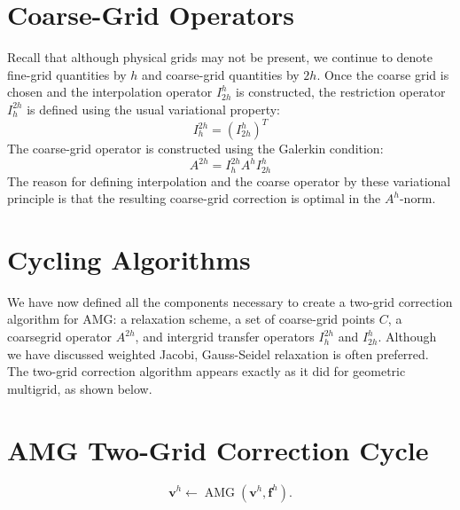 \documentclass[11pt]{book}
\begin{document}
\section*{Coarse-Grid Operators}
Recall that although physical grids may not be present, we continue to denote fine-grid quantities by $h$ and coarse-grid quantities by $2 h$. Once the coarse grid is chosen and the interpolation operator $I_{2 h}^{h}$ is constructed, the restriction operator $I_{h}^{2 h}$ is defined using the usual variational property:
$$
I_{h}^{2 h}=\left(I_{2 h}^{h}\right)^{T}
$$
The coarse-grid operator is constructed using the Galerkin condition:
$$
A^{2 h}=I_{h}^{2 h} A^{h} I_{2 h}^{h}
$$
The reason for defining interpolation and the coarse operator by these variational principle is that the resulting coarse-grid correction is optimal in the $A^{h}$-norm.

\section*{Cycling Algorithms}
We have now defined all the components necessary to create a two-grid correction algorithm for AMG: a relaxation scheme, a set of coarse-grid points $C$, a coarsegrid operator $A^{2 h}$, and intergrid transfer operators $I_{h}^{2 h}$ and $I_{2 h}^{h}$. Although we have discussed weighted Jacobi, Gauss-Seidel relaxation is often preferred. The two-grid correction algorithm appears exactly as it did for geometric multigrid, as shown below.

\section*{AMG Two-Grid Correction Cycle}
$$
\mathbf{v}^{h} \leftarrow \operatorname{AMG}\left(\mathbf{v}^{h}, \mathbf{f}^{h}\right) .
$$
\end{document}
